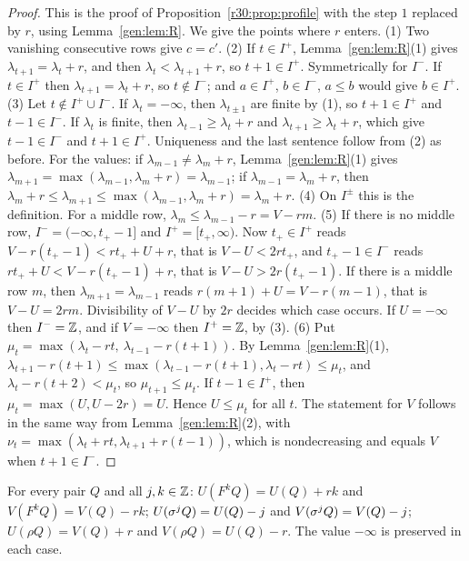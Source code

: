 \begin{proof}
This is the proof of Proposition~\ref{r30:prop:profile} with the step $1$ replaced by $r$, using Lemma~\ref{gen:lem:R}. We give the points where $r$ enters.
(1) Two vanishing consecutive rows give $c=c'$.
(2) If $t\in I^+$, Lemma~\ref{gen:lem:R}(1) gives $\lambda_{t+1}=\lambda_t+r$, and then $\lambda_t<\lambda_{t+1}+r$, so $t+1\in I^+$. Symmetrically for $I^-$. If $t\in I^+$ then $\lambda_{t+1}=\lambda_t+r$, so $t\notin I^-$; and $a\in I^+$, $b\in I^-$, $a\le b$ would give $b\in I^+$.
(3) Let $t\notin I^+\cup I^-$. If $\lambda_t=-\infty$, then $\lambda_{t\pm1}$ are finite by (1), so $t+1\in I^+$ and $t-1\in I^-$. If $\lambda_t$ is finite, then $\lambda_{t-1}\ge\lambda_t+r$ and $\lambda_{t+1}\ge\lambda_t+r$, which give $t-1\in I^-$ and $t+1\in I^+$. Uniqueness and the last sentence follow from (2) as before. For the values: if $\lambda_{m-1}\ne\lambda_m+r$, Lemma~\ref{gen:lem:R}(1) gives $\lambda_{m+1}=\max(\lambda_{m-1},\lambda_m+r)=\lambda_{m-1}$; if $\lambda_{m-1}=\lambda_m+r$, then $\lambda_m+r\le\lambda_{m+1}\le\max(\lambda_{m-1},\lambda_m+r)=\lambda_m+r$.
(4) On $I^\pm$ this is the definition. For a middle row, $\lambda_m\le\lambda_{m-1}-r=V-rm$.
(5) If there is no middle row, $I^-=(-\infty,t_+-1]$ and $I^+=[t_+,\infty)$. Now $t_+\in I^+$ reads $V-r(t_+-1)<rt_++U+r$, that is $V-U<2rt_+$, and $t_+-1\in I^-$ reads $rt_++U<V-r(t_+-1)+r$, that is $V-U>2r(t_+-1)$. If there is a middle row $m$, then $\lambda_{m+1}=\lambda_{m-1}$ reads $r(m+1)+U=V-r(m-1)$, that is $V-U=2rm$. Divisibility of $V-U$ by $2r$ decides which case occurs. If $U=-\infty$ then $I^-=\mathbb{Z}$, and if $V=-\infty$ then $I^+=\mathbb{Z}$, by (3).
(6) Put $\mu_t=\max(\lambda_t-rt,\ \lambda_{t-1}-r(t+1))$. By Lemma~\ref{gen:lem:R}(1), $\lambda_{t+1}-r(t+1)\le\max(\lambda_{t-1}-r(t+1),\lambda_t-rt)\le\mu_t$, and $\lambda_t-r(t+2)<\mu_t$, so $\mu_{t+1}\le\mu_t$. If $t-1\in I^+$, then $\mu_t=\max(U,U-2r)=U$. Hence $U\le\mu_t$ for all $t$. The statement for $V$ follows in the same way from Lemma~\ref{gen:lem:R}(2), with $\nu_t=\max(\lambda_t+rt,\lambda_{t+1}+r(t-1))$, which is nondecreasing and equals $V$ when $t+1\in I^-$.
\end{proof}

\begin{lemma}\label{gen:lem:transl}
For every pair $Q$ and all $j,k\in\mathbb{Z}$: $U(F^kQ)=U(Q)+rk$ and $V(F^kQ)=V(Q)-rk$; $U(\sigma^jQ)=U(Q)-j$ and $V(\sigma^jQ)=V(Q)-j$; $U(\rho Q)=V(Q)+r$ and $V(\rho Q)=U(Q)-r$. The value $-\infty$ is preserved in each case.
\end{lemma}

